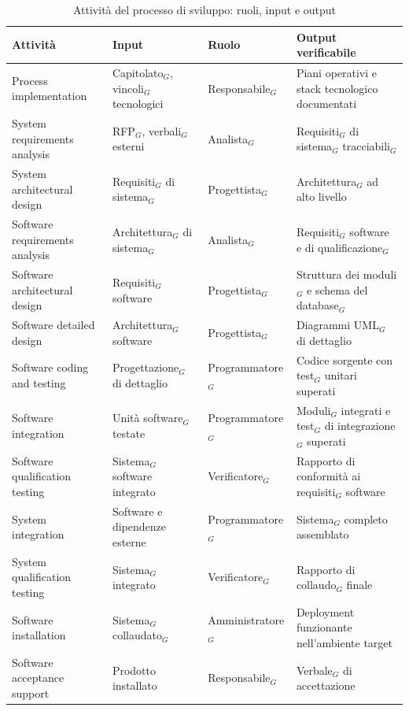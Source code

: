 \documentclass[a4paper, 10pt]{article}
\renewcommand{\arraystretch}{1.2}
\begin{document}
\begin{table}[H]
    \centering
    \renewcommand{\arraystretch}{1.3}
    \begin{tabularx}{\textwidth}{|l|L|l|L|}
        \hline
        \textbf{Attività} & \textbf{Input} & \textbf{Ruolo} & \textbf{Output verificabile} \\
        \hline
        Process implementation & Capitolato$_G$, vincoli$_G$ tecnologici & Responsabile$_G$ & Piani operativi e stack tecnologico documentati \\ \hline
        System requirements analysis & RFP$_G$, verbali$_G$ esterni & Analista$_G$ & Requisiti$_G$ di sistema$_G$ tracciabili$_G$ \\ \hline
        System architectural design & Requisiti$_G$ di sistema$_G$ & Progettista$_G$ & Architettura$_G$ ad alto livello \\ \hline
        Software requirements analysis & Architettura$_G$ di sistema$_G$ & Analista$_G$ & Requisiti$_G$ software e di qualificazione$_G$ \\ \hline
        Software architectural design & Requisiti$_G$ software & Progettista$_G$ & Struttura dei moduli$_G$ e schema del database$_G$ \\ \hline
        Software detailed design & Architettura$_G$ software & Progettista$_G$ & Diagrammi UML$_G$ di dettaglio \\ \hline
        Software coding and testing & Progettazione$_G$ di dettaglio & Programmatore$_G$ & Codice sorgente con test$_G$ unitari superati \\ \hline
        Software integration & Unità software$_G$ testate & Programmatore$_G$ & Moduli$_G$ integrati e test$_G$ di integrazione$_G$ superati \\ \hline
        Software qualification testing & Sistema$_G$ software integrato & Verificatore$_G$ & Rapporto di conformità ai requisiti$_G$ software \\ \hline
        System integration & Software e dipendenze esterne & Programmatore$_G$ & Sistema$_G$ completo assemblato \\ \hline
        System qualification testing & Sistema$_G$ integrato & Verificatore$_G$ & Rapporto di collaudo$_G$ finale \\ \hline
        Software installation & Sistema$_G$ collaudato$_G$ & Amministratore$_G$ & Deployment funzionante nell'ambiente target \\ \hline
        Software acceptance support & Prodotto installato & Responsabile$_G$ & Verbale$_G$ di accettazione \\ \hline
    \end{tabularx}
    \caption{Attività del processo di sviluppo: ruoli, input e output}
\end{table}
\end{document}
